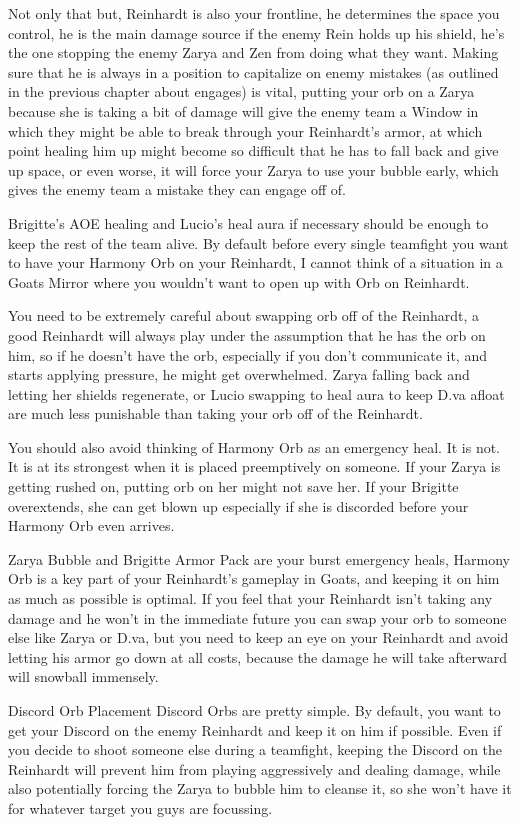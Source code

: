 Not only that but, Reinhardt is also your frontline, he determines the space you control, he is the main damage source if the enemy Rein holds up his shield, he’s the one stopping the enemy Zarya and Zen from doing what they want. Making sure that he is always in a position to capitalize on enemy mistakes (as outlined in the previous chapter about engages) is vital, putting your orb on a Zarya because she is taking a bit of damage will give the enemy team a Window in which they might be able to break through your Reinhardt's armor, at which point healing him up might become so difficult that he has to fall back and give up space, or even worse, it will force your Zarya to use your bubble early, which gives the enemy team a mistake they can engage off of. 

Brigitte’s AOE healing and Lucio’s heal aura if necessary should be enough to keep the rest of the team alive. By default before every single teamfight you want to have your Harmony Orb on your Reinhardt, I cannot think of a situation in a Goats Mirror where you wouldn’t want to open up with Orb on Reinhardt.

You need to be extremely careful about swapping orb off of the Reinhardt, a good Reinhardt will always play under the assumption that he has the orb on him, so if he doesn’t have the orb, especially if you don’t communicate it, and starts applying pressure, he might get overwhelmed. Zarya falling back and letting her shields regenerate, or Lucio swapping to heal aura to keep D.va afloat are much less punishable than taking your orb off of the Reinhardt.

You should also avoid thinking of Harmony Orb as an emergency heal. It is not. It is at its strongest when it is placed preemptively on someone. If your Zarya is getting rushed on, putting orb on her might not save her. If your Brigitte overextends, she can get blown up especially if she is discorded before your Harmony Orb even arrives.

Zarya Bubble and Brigitte Armor Pack are your burst emergency heals, Harmony Orb is a key part of your Reinhardt's gameplay in Goats, and keeping it on him as much as possible is optimal. If you feel that your Reinhardt isn’t taking any damage and he won’t in the immediate future you can swap your orb to someone else like Zarya or D.va, but you need to keep an eye on your Reinhardt and avoid letting his armor go down at all costs, because the damage he will take afterward will snowball immensely.

Discord Orb Placement
Discord Orbs are pretty simple. By default, you want to get your Discord on the enemy Reinhardt and keep it on him if possible. Even if you decide to shoot someone else during a teamfight, keeping the Discord on the Reinhardt will prevent him from playing aggressively and dealing damage, while also potentially forcing the Zarya to bubble him to cleanse it, so she won’t have it for whatever target you guys are focussing.

